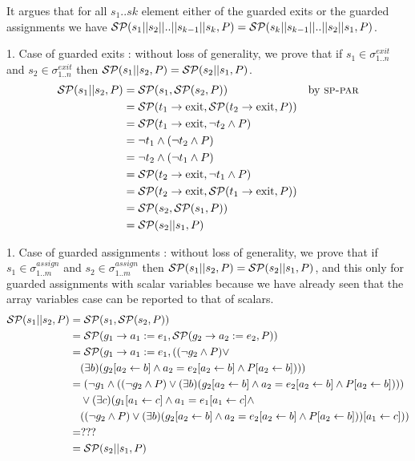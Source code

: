 \documentclass[a4paper,10pt]{article}
\newcommand{\KWexit}{\ensuremath{\mathrm{exit}}}
\newcommand{\vstate}[2]{\ensuremath{\sigma^{\mathit{#1}}_{\mathit{#2}}\xspace}}
\newcommand{\sppar}{\textsc{sp-par}\xspace}
\newenvironment{proof}[1][Proof.]{\begin{trivlist}
\item[\hskip \labelsep {\bfseries #1}]}{\end{trivlist}}
\begin{document}
\begin{proof}
  It argues that for all $s_1 .. sk$ element either of the guarded exits or the guarded assignments
  we have $\mathcal{SP}(s_1||s_2|| .. ||s_{k-1}||s_k,P)=\mathcal{SP}(s_k||s_{k-1}|| .. ||s_2||s_1,P)$. 

1. Case of guarded exits : without loss of generality, 
   we prove that if $s_1 \in \vstate{exit}{1..n}$ and $s_2 \in \vstate{exit}{1..n}$ then  
   $\mathcal{SP}(s_1||s_2,P)=\mathcal{SP}(s_2||s_1,P)$.
  \begin{align*}
    \spost{s_1||s_2}{P}
    &=\spost{s_1}{\spost{s_2}{P}} && \text{by \sppar}\\
    &=\spost{t_1 \rightarrow \KWexit}{\spost{t_2 \rightarrow \KWexit}{P}}\\
    &=\spost{t_1 \rightarrow \KWexit}{\neg t_2 \land P}\\
    &=\neg t_1 \land (\neg t_2 \land P)\\
    &=\neg t_2 \land (\neg t_1 \land P)\\
    &=\spost{t_2 \rightarrow \KWexit}{\neg t_1 \land P}\\
    &=\spost{t_2 \rightarrow \KWexit}{\spost{t_1 \rightarrow \KWexit}{P}}\\
    &=\spost{s_2}{\spost{s_1}{P}}\\
    &=\spost{s_2||s_1}{P}
  \end{align*}

1. Case of guarded assignments : without loss of generality, 
   we prove that if $s_1 \in \vstate{assign}{1..m}$ and $s_2 \in \vstate{assign}{1..m}$ then  
   $\mathcal{SP}(s_1||s_2,P)=\mathcal{SP}(s_2||s_1,P)$, and this only for guarded assignments with 
   scalar variables because we have already seen that the array variables case can be reported 
   to that of scalars.
  \begin{align*}
    \mathcal{SP}(s_1||s_2,P)
    &=\mathcal{SP}(s_1,\mathcal{SP}(s_2,P)) \\
    &=\mathcal{SP}(g_1 \rightarrow a_1 := e_1,\mathcal{SP}(g_2 \rightarrow a_2 := e_2,P)) \\
    &=\mathcal{SP}(g_1 \rightarrow a_1 := e_1,((\neg g_2 \land P) \lor\\
    &\quad (\exists b) (g_2[a_2 \leftarrow b] \land a_2 =e_2[a_2 \leftarrow b] \land P[a_2 \leftarrow b])))\\
    &=( \neg g_1 \land ((\neg g_2 \land P) \lor
    (\exists b) (g_2[a_2 \leftarrow b] \land a_2 =e_2[a_2 \leftarrow b] \land P[a_2 \leftarrow b]))) \\
    &\quad \lor (\exists c)(g_1[a_1 \leftarrow c]\land a_1 =e_1[a_1 \leftarrow c] \land \\
    &\quad ((\neg g_2 \land P) \lor (\exists b) (g_2[a_2 \leftarrow b] \land 
      a_2 =e_2[a_2 \leftarrow b] \land P[a_2 \leftarrow b]))[a_1 \leftarrow c]))\\
    &= ???\\
    &=\mathcal{SP}(s_2||s_1,P)
  \end{align*}

\end{proof}
\end{document}
